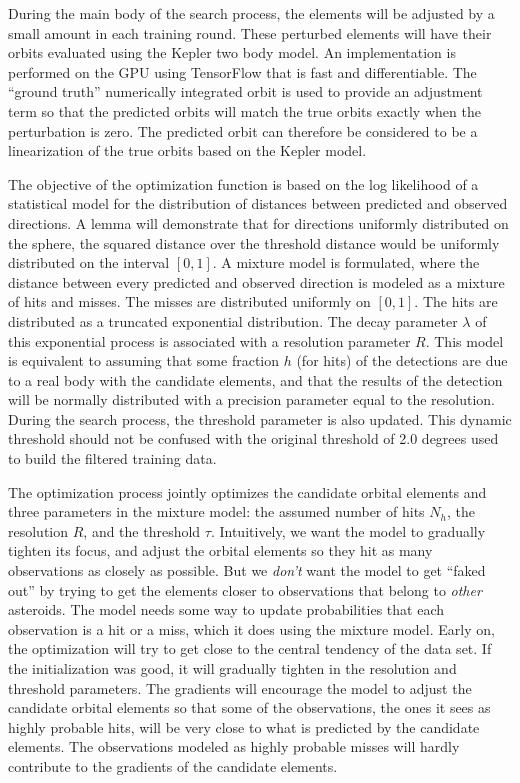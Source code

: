 During the main body of the search process, the elements will be adjusted by a small amount in each training round.
These perturbed elements will have their orbits evaluated using the Kepler two body model.
An implementation is performed on the GPU using TensorFlow that is fast and differentiable.
The ``ground truth'' numerically integrated orbit is used to provide an adjustment term 
so that the predicted orbits will match the true orbits exactly when the perturbation is zero.
The predicted orbit can therefore be considered to be a linearization of the true orbits based on the Kepler model.

The objective of the optimization function is based on the log likelihood of a statistical model for the 
distribution of distances between predicted and observed directions.
A lemma will demonstrate that for directions uniformly distributed on the sphere, the squared distance over the 
threshold distance would be uniformly distributed on the interval $[0, 1]$.
A mixture model is formulated, where the distance between every predicted and observed direction is modeled as a mixture of hits and misses.
The misses are distributed uniformly on $[0, 1]$.
The hits are distributed as a truncated exponential distribution.
The decay parameter $\lambda$ of this exponential process is associated with a resolution parameter $R$.
This model is equivalent to assuming that some fraction $h$ (for hits) of the detections are due to 
a real body with the candidate elements, and that the results of the detection will be normally distributed 
with a precision parameter equal to the resolution.
During the search process, the threshold parameter is also updated.
This dynamic threshold should not be confused with the original threshold of 2.0 degrees used to build the filtered training data.

The optimization process jointly optimizes the candidate orbital elements and three parameters in the mixture model:
the assumed number of hits $N_{h}$, the resolution $R$, and the threshold $\tau$. 
Intuitively, we want the model to gradually tighten its focus, and adjust the orbital elements so they hit as many observations as closely as possible.
But we \textit{don't} want the model to get ``faked out'' by trying to get the elements closer to observations that belong to \textit{other} asteroids.
The model needs some way to update probabilities that each observation is a hit or a miss, which it does using the mixture model.
Early on, the optimization will try to get close to the central tendency of the data set.
If the initialization was good, it will gradually tighten in the resolution and threshold parameters.
The gradients will encourage the model to adjust the candidate orbital elements so that some of the observations,
the ones it sees as highly probable hits, will be very close to what is predicted by the candidate elements.
The observations modeled as highly probable misses will hardly contribute to the gradients of the candidate elements.

